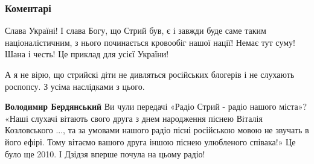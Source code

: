  
 
 
 
 
\subsubsection{Коментарі}
\label{sec:16_05_2021.fb.nicoj_larisa.1.stryj_kiev_ukraina_mova.cmt}

\begin{itemize}

 

Слава Україні! І слава Богу, що Стрий був, є і завжди буде саме таким
націоналістичним, з нього починається кровообіг нашої нації! Немає тут суму!
Шана і честь! Це приклад для усієї України!

 

А я не вірю, що стрийскі діти не дивляться російських блогерів і не слухають
роспопсу. З усіма наслідками з цього.

 

\textbf{Володимир Бердянський} Ви чули передачі «Радіо Стрий - радіо нашого міста»?
«Наші слухачі вітають свого друга з днем народження піснею Віталія Козловського
..., та за умовами нашого радіо пісні російською мовою не звучать в його ефірі.
Тому вітаємо вашого друга іншою піснею улюбленого співака!» Це було ще 2010. І
Дзідзя вперше почула на цьому радіо!

 


\end{itemize}

